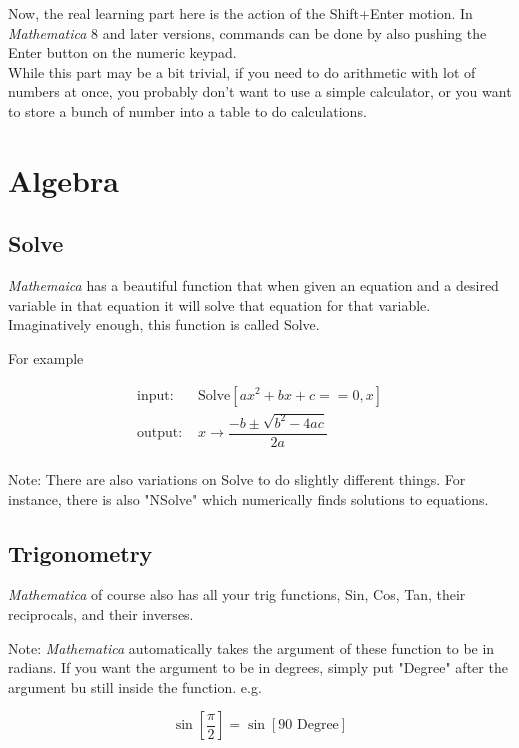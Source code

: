 \documentclass[11pt,letterpaper,twoside,titlepage]{report}
\newcommand{\Mathematica}{\textit{Mathematica} }
\begin{document}
			Now, the real learning part here is the action of the Shift+Enter motion.  In \Mathematica 8 and later versions, commands can be done by also pushing the Enter button on the numeric keypad. \\
			
			While this part may be a bit trivial, if you need to do arithmetic with lot of numbers at once, you probably don't want to use a simple calculator, or you want to store a bunch of number into a table to do calculations.
		
		\chapter{Algebra}
				
			\section{Solve}				
						
				\textit{Mathemaica} has a beautiful function that when given an equation and a desired variable in that equation it will solve that equation for that variable.  Imaginatively enough, this function is called Solve.
						
				For example
					
				\begin{align*}
					\text{input: }& \text{Solve}[ ax^2 + bx + c == 0, x ] \\
					\text{output: }& x \rightarrow \dfrac{ -b \pm \sqrt{b^2 - 4ac } }{ 2a } \\
				\end{align*}
						
				Note: There are also variations on Solve to do slightly different things.  For instance, there is also "NSolve" which numerically finds solutions to equations.
						
			\section{Trigonometry}
					
				\Mathematica of course also has all your trig functions, Sin, Cos, Tan, their reciprocals, and their inverses.  
						
				Note: \Mathematica automatically takes the argument of these function to be in radians.  If you want the argument to be in degrees, simply put "Degree" after the argument bu still inside the function.  e.g. 
						
				\[ \sin\left[ \frac{ \pi }{2} \right] = \sin[ 90 \text{ Degree} ] \]
						
\end{document}

